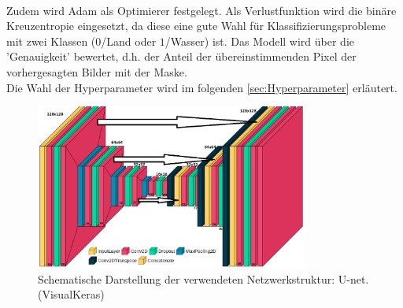 \\
Zudem wird Adam als Optimierer festgelegt.
Als Verlustfunktion wird die binäre Kreuzentropie eingesetzt, da diese eine gute Wahl für Klassifizierungsprobleme mit zwei Klassen ($0$/Land oder $1$/Wasser) ist.
Das Modell wird über die 'Genauigkeit' bewertet, d.h. der Anteil der übereinstimmenden Pixel der vorhergesagten Bilder mit der Maske.
\\
Die Wahl der Hyperparameter wird im folgenden \autoref{sec:Hyperparameter} erläutert.
\begin{figure}
    \centering
    \includegraphics[width=0.8\textwidth]{content/img/unet_struc_bearbeitet_2.png}
    \caption{Schematische Darstellung der verwendeten Netzwerkstruktur: U-net. (VisualKeras)}
    \label{fig:unet_structure}
\end{figure}

\FloatBarrier

